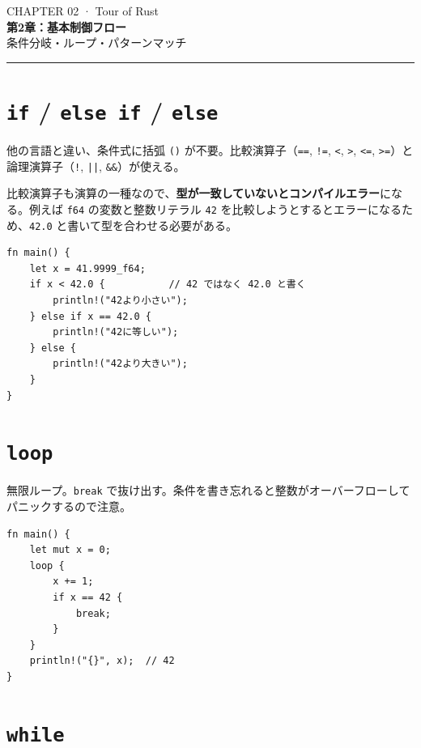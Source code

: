 \documentclass[12pt,a4paper]{article}
\begin{document}
\begin{center}
  {\small\ttfamily\color{codered} CHAPTER 02 · Tour of Rust}\\[6pt]
  {\LARGE\bfseries 第2章：基本制御フロー}\\[4pt]
  {\small\color{gray} 条件分岐・ループ・パターンマッチ}
\end{center}

\vspace{2mm}\hrule\vspace{6mm}

\section{\texttt{if} / \texttt{else if} / \texttt{else}}

他の言語と違い、条件式に括弧 \texttt{()} が不要。比較演算子（\texttt{==}, \texttt{!=}, \texttt{<}, \texttt{>}, \texttt{<=}, \texttt{>=}）と論理演算子（\texttt{!}, \texttt{||}, \texttt{\&\&}）が使える。

比較演算子も演算の一種なので、\textbf{型が一致していないとコンパイルエラー}になる。例えば \texttt{f64} の変数と整数リテラル \texttt{42} を比較しようとするとエラーになるため、\texttt{42.0} と書いて型を合わせる必要がある。

\begin{lstlisting}
fn main() {
    let x = 41.9999_f64;
    if x < 42.0 {           // 42 ではなく 42.0 と書く
        println!("42より小さい");
    } else if x == 42.0 {
        println!("42に等しい");
    } else {
        println!("42より大きい");
    }
}
\end{lstlisting}

\section{\texttt{loop}}

無限ループ。\texttt{break} で抜け出す。条件を書き忘れると整数がオーバーフローしてパニックするので注意。

\begin{lstlisting}
fn main() {
    let mut x = 0;
    loop {
        x += 1;
        if x == 42 {
            break;
        }
    }
    println!("{}", x);  // 42
}
\end{lstlisting}

\section{\texttt{while}}
\end{document}
